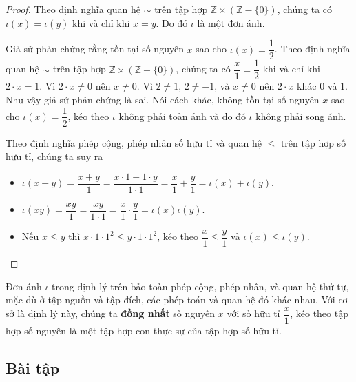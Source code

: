 \begin{proof}
    Theo định nghĩa quan hệ $\sim$ trên tập hợp $\mathbb{Z}\times (\mathbb{Z} - \{0\})$, chúng ta có $\iota(x) = \iota(y)$ khi và chỉ khi $x = y$. Do đó $\iota$ là một đơn ánh.

    Giả sử phản chứng rằng tồn tại số nguyên $x$ sao cho $\iota(x) = \dfrac{1}{2}$. Theo định nghĩa quan hệ $\sim$ trên tập hợp $\mathbb{Z}\times (\mathbb{Z} - \{0\})$, chúng ta có $\dfrac{x}{1} = \dfrac{1}{2}$ khi và chỉ khi $2\cdot x = 1$. Vì $2\cdot x\ne 0$ nên $x\ne 0$. Vì $2\ne 1$, $2\ne -1$, và $x\ne 0$ nên $2\cdot x$ khác $0$ và $1$. Như vậy giả sử phản chứng là sai. Nói cách khác, không tồn tại số nguyên $x$ sao cho $\iota(x) = \dfrac{1}{2}$, kéo theo $\iota$ không phải toàn ánh và do đó $\iota$ không phải song ánh.

    Theo định nghĩa phép cộng, phép nhân số hữu tỉ và quan hệ $\leq$ trên tập hợp số hữu tỉ, chúng ta suy ra
    \begin{itemize}
        \item $\iota(x + y) = \dfrac{x + y}{1} = \dfrac{x\cdot 1 + 1\cdot y}{1\cdot 1} = \dfrac{x}{1} + \dfrac{y}{1} = \iota(x) + \iota(y)$.
        \item $\iota(xy) = \dfrac{xy}{1} = \dfrac{xy}{1\cdot 1} = \dfrac{x}{1}\cdot\dfrac{y}{1} = \iota(x)\iota(y)$.
        \item Nếu $x\leq y$ thì $x\cdot 1\cdot 1^{2}\leq y\cdot 1\cdot 1^{2}$, kéo theo $\dfrac{x}{1}\leq \dfrac{y}{1}$ và $\iota(x)\leq \iota(y)$.
    \end{itemize}
\end{proof}

Đơn ánh $\iota$ trong định lý trên bảo toàn phép cộng, phép nhân, và quan hệ thứ tự, mặc dù ở tập nguồn và tập đích, các phép toán và quan hệ đó khác nhau. Với cơ sở là định lý này, chúng ta \textbf{đồng nhất} số nguyên $x$ với số hữu tỉ $\dfrac{x}{1}$, kéo theo tập hợp số nguyên là một tập hợp con thực sự của tập hợp số hữu tỉ.

\subsection{Bài tập}

